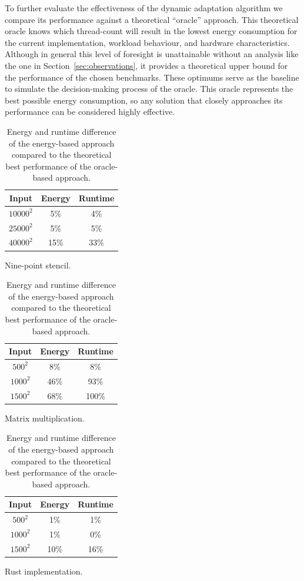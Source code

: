 To further evaluate the effectiveness of the dynamic adaptation algorithm we compare its performance
against a theoretical ``oracle'' approach. This theoretical oracle knows which thread-count will
result in the lowest energy consumption for the current implementation, workload behaviour, and
hardware characteristics. Although in general this level of foresight is unattainable without an
analysis like the one in Section~\ref{sec:observations}, it provides a theoretical upper bound for
the performance of the chosen benchmarks. These optimums serve as the baseline to simulate the
decision-making process of the oracle. This oracle represents the best possible energy consumption,
so any solution that closely approaches its performance can be considered highly effective.

\begin{table}[ht]
    \centering
    \begin{subtable}{0.33\linewidth}
        \centering
        \begin{tabular}{ccc}\hline
            Input     & Energy & Runtime \\\hline
            $10000^2$ &    5\% &     4\% \\
            $25000^2$ &    5\% &     5\% \\
            $40000^2$ &   15\% &    33\% \\\hline
        \end{tabular}
        \caption{Nine-point stencil.}
        \label{tab:oracle-stencil}
    \end{subtable}%
    \begin{subtable}{0.33\linewidth}
        \centering
        \begin{tabular}{ccc}\hline
            Input    & Energy & Runtime \\\hline
            $ 500^2$ &    8\% &     8\% \\
            $1000^2$ &   46\% &    93\% \\
            $1500^2$ &   68\% &   100\% \\\hline
        \end{tabular}
        \caption{Matrix multiplication.}
        \label{tab:oracle-matmul}
    \end{subtable}%
    \begin{subtable}{0.33\linewidth}
        \centering
        \begin{tabular}{ccc}\hline
            Input    & Energy & Runtime \\\hline
            $ 500^2$ &    1\% &     1\% \\
            $1000^2$ &    1\% &     0\% \\
            $1500^2$ &   10\% &    16\% \\\hline
        \end{tabular}
        \caption{Rust implementation.}
        \label{tab:oracle-rust}
    \end{subtable}%
    \caption{Energy and runtime difference of the energy-based approach compared to the theoretical
    best performance of the oracle-based approach.}
    \label{fig:oracle}
\end{table}

